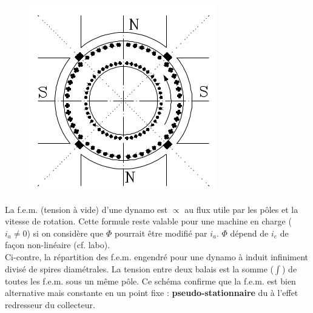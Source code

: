		\newpage
		\begin{figure}
		\includegraphics[scale=0.4]{ch4/image6.png}
		\end{figure}
		La f.e.m. (tension à vide) d'une dynamo est $\propto$ au flux 
		utile par les pôles et la vitesse de rotation. Cette formule 
		reste valable pour une machine en charge ($i_a\neq0$) si on 
		considère que $\Phi$ pourrait être modifié par $i_a$. $\Phi$ 
		dépend de $i_e$ de façon non-linéaire (cf. labo).\\
		
		Ci-contre, la répartition des f.e.m. engendré pour une dynamo 
		à induit infiniment divisé de spires diamétrales. La tension 
		entre deux balais est la somme ($\int$) de toutes les f.e.m. 
		sous un même pôle. Ce schéma confirme que la f.e.m. est bien 
		alternative mais constante en un point fixe : 
		\textbf{pseudo-stationnaire} du à l'effet redresseur du 
		collecteur.

